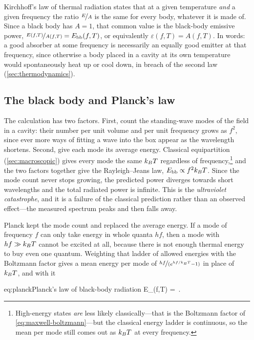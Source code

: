         Kirchhoff's law of thermal radiation states that at a given temperature \emph{and} a given frequency the ratio $\nicefrac{E}{A}$ is the same for every body, whatever it is made of. Since a black body has $A=1$, that common value is the black-body emissive power, $\nicefrac{E(f,T)}{A(f,T)}=E_{\text{bb}}(f,T)$, or equivalently $\varepsilon(f,T)=A(f,T)$. In words: a good absorber at some frequency is necessarily an equally good emitter at that frequency, since otherwise a body placed in a cavity at its own temperature would spontaneously heat up or cool down, in breach of the second law (\cref{sec:thermodynamics}).

    \subsection{The black body and Planck's law}

        The calculation has two factors. First, count the standing-wave modes of the field in a cavity: their number per unit volume and per unit frequency grows as $f^{2}$, since ever more ways of fitting a wave into the box appear as the wavelength shortens. Second, give each mode its average energy. Classical equipartition (\cref{sec:macroscopic}) gives every mode the same $k_{B} T$ regardless of frequency,\footnote{High-energy states \emph{are} less likely classically---that is the Boltzmann factor of \cref{eq:maxwell-boltzmann}---but the classical energy ladder is continuous, so the mean per mode still comes out as $k_{B} T$ at every frequency.} and the two factors together give the Rayleigh--Jeans law, $E_{\text{bb}} \propto f^{2}k_{B} T$. Since the mode count never stops growing, the predicted power diverges towards short wavelengths and the total radiated power is infinite. This is the \emph{ultraviolet catastrophe}, and it is a failure of the classical prediction rather than an observed effect---the measured spectrum peaks and then falls away.

        Planck kept the mode count and replaced the average energy. If a mode of frequency $f$ can only take energy in whole quanta $hf$, then a mode with $hf \gg k_{B} T$ cannot be excited at all, because there is not enough thermal energy to buy even one quantum. Weighting that ladder of allowed energies with the Boltzmann factor gives a mean energy per mode of $\nicefrac{hf}{(e^{hf/k_{B} T}-1)}$ in place of $k_{B} T$, and with it

        \begin{keyeq}{eq:planck}{Planck's law of black-body radiation}
            E_{}(f,T) = \,.
        \end{keyeq}

